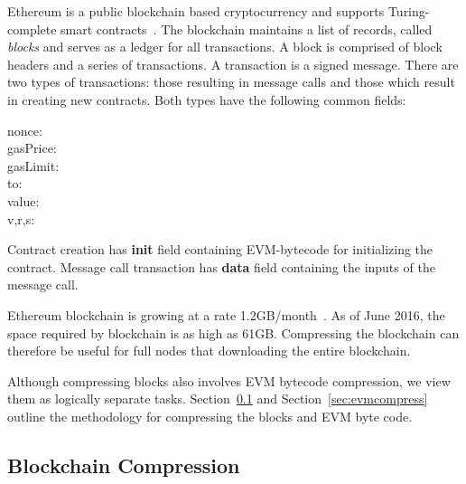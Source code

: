 
Ethereum is a public blockchain based cryptocurrency and supports Turing-complete smart contracts~\cite{ethereum}.
The blockchain maintains a list of records, called \emph{blocks} and serves as a ledger for all transactions.
A block is comprised of block headers and a series of transactions. A transaction is a signed message.
There are two types of transactions: those resulting in message calls and those which result
 in creating new contracts.
Both types have the following common fields:
\begin{description}
  \item[nonce:]
  \item[gasPrice:]
  \item[gasLimit:]
  \item[to:]
  \item[value:]
  \item[v,r,s:]
\end{description}

Contract creation has \textbf{init} field containing EVM-bytecode for initializing the contract.
Message call transaction has \textbf{data} field containing the inputs of the message call.

Ethereum blockchain is growing at a rate 1.2GB/month~\cite{ethdiskspace}.
As of June 2016, the space required by blockchain is as high as 61GB.
Compressing the blockchain can therefore be useful for full nodes that downloading the entire blockchain.

Although compressing blocks also involves EVM bytecode compression, we view them as logically separate tasks.
Section~\ref{sec:blockcompress} and 
Section~\ref{sec:evmcompress}  
outline the methodology for compressing the blocks and EVM byte code.

\subsection{Blockchain Compression}\label{sec:blockcompress}

%

